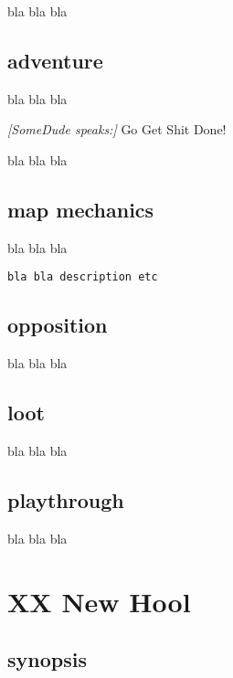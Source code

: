 bla bla bla


\subsection*{adventure}

bla bla bla

\begin{readoutloud}
\emph{[SomeDude speaks:]}
Go Get Shit Done!
\end{readoutloud}

\noindent bla bla bla

\subsection*{map mechanics}

bla bla bla

\small \begin{verbatim}
bla bla description etc
\end{verbatim} \normalsize


\subsection*{opposition}

bla bla bla


\subsection*{loot}

bla bla bla


\subsection*{playthrough}

bla bla bla






\newpage
\section*{XX New Hool}


\subsection*{synopsis}

